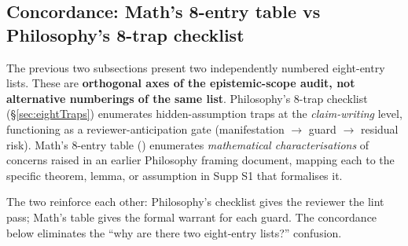 %

\subsection*{Concordance: Math's 8-entry table vs Philosophy's 8-trap checklist}
\label{sec:S0-concordance}

The previous two subsections present two independently numbered eight-entry lists. These are \textbf{orthogonal axes of the epistemic-scope audit, not alternative numberings of the same list}. Philosophy's 8-trap checklist (\S\ref{sec:eightTraps}) enumerates hidden-assumption traps at the \emph{claim-writing} level, functioning as a reviewer-anticipation gate (manifestation $\rightarrow$ guard $\rightarrow$ residual risk). Math's 8-entry table () enumerates \emph{mathematical characterisations} of concerns raised in an earlier Philosophy framing document, mapping each to the specific theorem, lemma, or assumption in Supp S1 that formalises it.

The two reinforce each other: Philosophy's checklist gives the reviewer the lint pass; Math's table gives the formal warrant for each guard. The concordance below eliminates the ``why are there two eight-entry lists?'' confusion.

